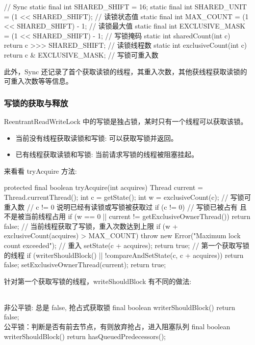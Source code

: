 \begin{Java}
// Sync
static final int SHARED_SHIFT   = 16;
static final int SHARED_UNIT    = (1 << SHARED_SHIFT);      // 读锁状态值
static final int MAX_COUNT      = (1 << SHARED_SHIFT) - 1;  // 读锁最大值
static final int EXCLUSIVE_MASK = (1 << SHARED_SHIFT) - 1;  // 写锁掩码
static int sharedCount(int c)    { return c >>> SHARED_SHIFT; } // 读锁线程数
static int exclusiveCount(int c) { return c & EXCLUSIVE_MASK; } // 写锁可重入数
\end{Java}

此外，Sync 还记录了首个获取读锁的线程，其重入次数，其他获线程获取读锁的可重入次数等等信息。

\subsubsection*{写锁的获取与释放}

ReentrantReadWriteLock 中的写锁是独占锁，某时只有一个线程可以获取该锁。
\begin{itemize}
    \item 当前没有线程获取读锁和写锁: 可以获取写锁并返回。
    \item 已有线程获取读锁和写锁: 当前请求写锁的线程被阻塞挂起。
\end{itemize}

来看看 tryAcquire 方法:

\begin{Java}
protected final boolean tryAcquire(int acquires) {
    Thread current = Thread.currentThread();
    int c = getState();
    int w = exclusiveCount(c);  // 写锁可重入数
    // c != 0 说明已经有读锁或写锁被获取过
    if (c != 0) {
        // 写锁已被占有 且 不是被当前线程占用
        if (w == 0 || current != getExclusiveOwnerThread())
            return false;
        // 当前线程获取了写锁，重入次数达到上限
        if (w + exclusiveCount(acquires) > MAX_COUNT)
            throw new Error("Maximum lock count exceeded");
        // 重入
        setState(c + acquires);
        return true;
    }
    // 第一个获取写锁的线程
    if (writerShouldBlock() || !compareAndSetState(c, c + acquires))
        return false;
    setExclusiveOwnerThread(current);
    return true;
}
\end{Java}

针对第一个获取写锁的线程，writeShouldBlock 有不同的做法:

\begin{Java}
\\ 非公平锁: 总是 false, 抢占式获取锁
final boolean writerShouldBlock() {
    return false;
}
\\ 公平锁：判断是否有前去节点，有则放弃抢占，进入阻塞队列
final boolean writerShouldBlock() {
    return hasQueuedPredecessors();
}
\end{Java}

